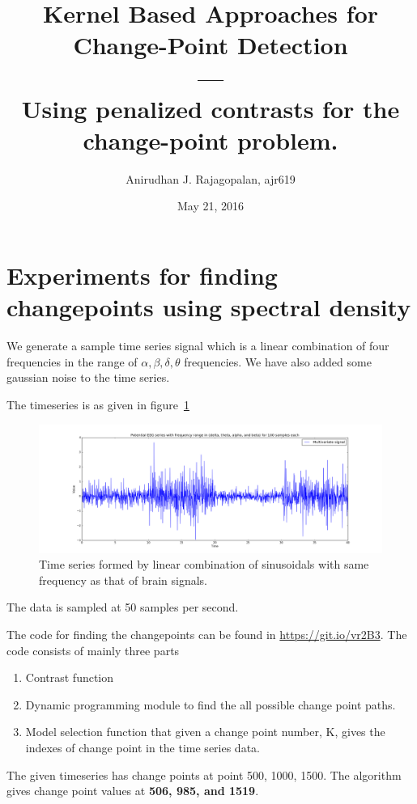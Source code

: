 \documentclass{article}
\begin{document}
\title{Kernel Based Approaches for Change-Point Detection \\ --- \\ Using penalized contrasts for the change-point problem. }
\date{May 21, 2016}
\author{Anirudhan J. Rajagopalan, ajr619}

\maketitle

\newpage

\section{Experiments for finding changepoints using spectral density}
We generate a sample time series signal which is a linear combination of four frequencies in the range of $\alpha, \beta, \delta, \theta $ frequencies.  We have also added some gaussian noise to the time series.

The timeseries is as given in figure~\ref{fig:cp_sd_ts}
\begin{figure}[ht!]
  \centering
  \includegraphics[width=1\textwidth]{images/changepoint_sd/ts}
  \caption{Time series formed by linear combination of sinusoidals with same frequency as that of brain signals.\label{fig:cp_sd_ts}}
\end{figure}

The data is sampled at 50 samples per second.

The code for finding the changepoints can be found in \url{https://git.io/vr2B3}.  The code consists of mainly three parts
\begin{enumerate}
  \item Contrast function
  \item Dynamic programming module to find the all possible change point paths.
  \item Model selection function that given a change point number, K, gives the indexes of change point in the time series data.
\end{enumerate}

The given timeseries has change points at point 500, 1000, 1500.  The algorithm gives change point values at \textbf{506, 985, and 1519}.



\end{document}

